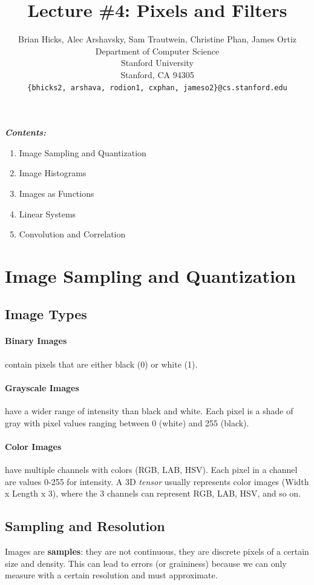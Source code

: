 \documentclass{article}
\title{Lecture \#4: Pixels and Filters}
\author{
  Brian Hicks, Alec Arshavsky, Sam Trautwein, Christine Phan, James Ortiz \\
  Department of Computer Science\\
  Stanford University\\
  Stanford, CA 94305 \\
  \texttt{\{bhicks2, arshava, rodion1, cxphan, jameso2\}@cs.stanford.edu} \\
}
\begin{document}
\maketitle


\emph{\textbf{Contents:}}
\begin{enumerate}
  \item Image Sampling and Quantization
  \item Image Histograms
  \item Images as Functions
  \item Linear Systems
  \item Convolution and Correlation
\end{enumerate}




\section{Image Sampling and Quantization}

\subsection{Image Types}
\paragraph{Binary Images} 
        contain pixels that are either black (0) or white (1).
			\paragraph{Grayscale Images} have a wider range of intensity than black and white. Each pixel is a shade of gray with pixel values ranging between 0 (white) and 255 (black). 
			\paragraph{Color Images} have multiple channels with colors (RGB, LAB, HSV). Each pixel in a channel are values 0-255 for intensity.  
            A 3D \emph{tensor} usually represents color images (Width x Length x 3), where the 3 channels can represent RGB, LAB, HSV, and so on.
         
		
	\subsection{Sampling and Resolution}
    Images are \textbf{samples}: they are not continuous, they are discrete pixels of a certain size and density. This can lead to errors (or graininess) because we can only measure with a certain resolution and must approximate.
			
\end{document}
